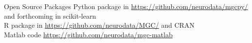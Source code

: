 \documentclass[mathserif,t]{beamer}
\newcommand{\blind}{0}
\newcommand{\Mgc}{MGC}
\begin{document}
\begin{frame}{Open Source Packages}
Python package in \url{https://github.com/neurodata/mgcpy/} and forthcoming in scikit-learn\\
\bigskip
R package in \url{https://github.com/neurodata/MGC/} and CRAN\\
\bigskip
Matlab code \url{https://github.com/neurodata/mgc-matlab}
\end{frame}
\end{document}
